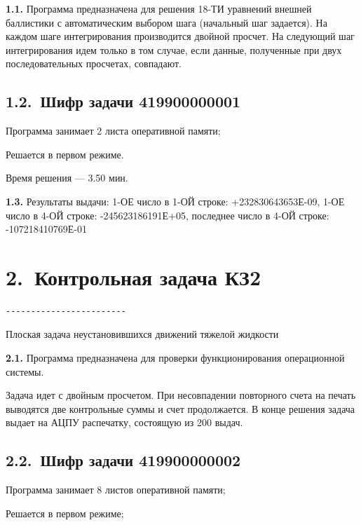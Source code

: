 \documentclass[11pt,a4paper]{article}
\begin{document}
\par\textbf{1.1.} Программа предназначена для решения 18-ТИ уравнений внешней баллистики с автоматическим выбором шага (начальный шаг задается). На каждом шаге интегрирования производится двойной просчет. На следующий шаг интегрирования идем только в том случае, если данные, полученные при двух последовательных просчетах, совпадают.\par
\subsection*{1.2.~Шифр задачи 419900000001}
Программа занимает 2 листа оперативной памяти;

Решается в первом режиме.

Время решения --- 3.50 мин.

\par\textbf{1.3.} Результаты выдачи: 1-ОЕ число в 1-ОЙ строке: +232830643653Е-09, 1-ОЕ число в 4-ОЙ строке: -245623186191Е+05, последнее число в 4-ОЙ строке: -107218410769Е-01\par
\section*{2.~Контрольная задача КЗ2}
\begin{center}\small
\begin{BVerbatim}
------------------------
\end{BVerbatim}
\end{center}

Плоская задача неустановившихся движений тяжелой жидкости

\par\textbf{2.1.} Программа предназначена для проверки функционирования операционной системы.\par
Задача идет с двойным просчетом. При несовпадении повторного счета на печать выводятся две контрольные суммы и счет продолжается. В конце решения задача выдает на АЦПУ распечатку, состоящую из 200 выдач.

\subsection*{2.2.~Шифр задачи 419900000002}
Программа занимает 8 листов оперативной памяти;

Решается в первом режиме;
\end{document}
